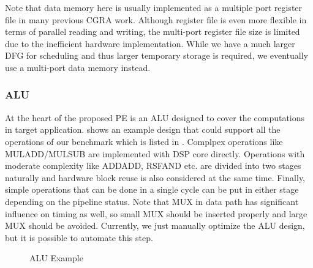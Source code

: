 Note that data memory here is usually implemented as a multiple port register file in many previous CGRA work. Although register file is even more flexible in terms of parallel reading and writing, the multi-port register file size is limited due to the inefficient hardware implementation. While we have a much larger DFG for scheduling and thus larger temporary storage is required, we eventually use a multi-port data memory instead. 

\subsubsection{ALU}
At the heart of the proposed PE is an ALU designed to cover the computations in target application.  shows an example design that could support all the operations of our benchmark which is listed in . Complpex operations like MULADD/MULSUB are implemented with DSP core directly. Operations with moderate complexity like ADDADD, RSFAND etc. are divided into two stages naturally and hardware block reuse is also considered at the same time. Finally, simple operations that can be done in a single cycle can be put in either stage depending on the pipeline status. Note that MUX in data path has significant influence on timing as well, so small MUX should be inserted properly and large MUX should be avoided. Currently, we just manually optimize the ALU design, but it is possible to automate this step. 

\begin{figure}[h]
\caption{ALU Example}
\label{fig:ALU}
\end{figure} 

